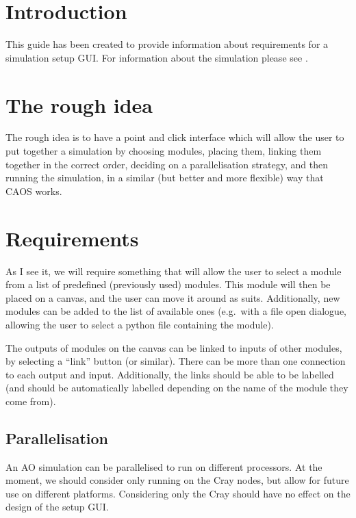\documentclass{article}
\begin{document}



\section{Introduction}
This guide has been created to provide information about requirements
for a simulation setup GUI.  For information about the simulation
please see \citet{dummies}.

\section{The rough idea}
The rough idea is to have a point and click interface which will allow
the user to put together a simulation by choosing modules, placing
them, linking them together in the correct order, deciding on a
parallelisation strategy, and then running the simulation, in a
similar (but better and more flexible) way that CAOS \citep{caos}
works.

\section{Requirements}
As I see it, we will require something that will allow the user to
select a module from a list of predefined (previously used) modules.
This module will then be placed on a canvas, and the user can move it
around as suits.  Additionally, new modules can be added to the list
of available ones (e.g.\ with a file open dialogue, allowing the user
to select a python file containing the module).

The outputs of modules on the canvas can be linked to inputs of other
modules, by selecting a ``link'' button (or similar).  There can be
more than one connection to each output and input.  Additionally, the
links should be able to be labelled (and should be automatically
labelled depending on the name of the module they come from).  

\subsection{Parallelisation}
An AO simulation can be parallelised to run on different processors.
At the moment, we should consider only running on the Cray nodes, but
allow for future use on different platforms.  Considering only the
Cray should have no effect on the design of the setup GUI.
\end{document}
